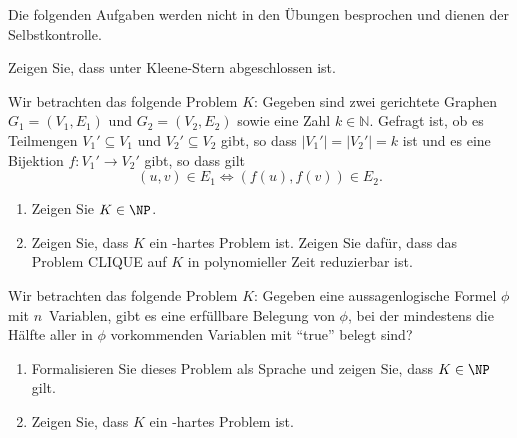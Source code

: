 \documentclass[german]{latteachCD}[2017/03/28]
\begin{document}
\maketitle

\begin{mdframed}
  Die folgenden Aufgaben werden nicht in den Übungen besprochen und dienen der
  Selbstkontrolle.

  \renewcommand{\theexercise}{\BoldGreek{exercise}}
  \setcounter{exercise}{1}

  \begin{exercise}
    Zeigen Sie, dass \NP{} unter Kleene-Stern abgeschlossen ist.
  \end{exercise}

  \begin{exercise}
    Wir betrachten das folgende Problem $K$: Gegeben sind zwei gerichtete
    Graphen $G_{1} = (V_{1}, E_{1})$ und $G_{2} = (V_{2}, E_{2})$ sowie eine
    Zahl $k \in \mathbb N$.  Gefragt ist, ob es Teilmengen $V_{1}' \subseteq
    V_{1}$ und $V_{2}' \subseteq V_{2}$ gibt, so dass $\lvert V_{1}'\rvert =
    \lvert V_{2}'\rvert = k$ ist und es eine Bijektion $f \colon V_{1}' \to
    V_{2}'$ gibt, so dass gilt
    \begin{equation*}
      (u,v) \in E_{1} \iff (f(u), f(v)) \in E_{2}.
    \end{equation*}
    \begin{enumerate}
    \item Zeigen Sie $K \in \NP$.
    \item Zeigen Sie, dass $K$ ein \NP-hartes Problem ist.  Zeigen Sie dafür,
      dass das Problem CLIQUE auf $K$ in polynomieller Zeit reduzierbar ist.
    \end{enumerate}
  \end{exercise}

\end{mdframed}

\vspace*{0.5\baselineskip}

\setcounter{exercise}{0}

\begin{exercise}
  Wir betrachten das folgende Problem $K$: Gegeben eine aussagenlogische
  Formel $\phi$ mit $n$~Variablen, gibt es eine erfüllbare Belegung von $\phi$,
  bei der mindestens die Hälfte aller in $\phi$ vorkommenden Variablen mit
  \enquote{true} belegt sind?
  \begin{enumerate}
  \item Formalisieren Sie dieses Problem als Sprache und zeigen Sie, dass $K \in
    \NP$ gilt.
  \item Zeigen Sie, dass $K$ ein \NP-hartes Problem ist.
  \end{enumerate}
\end{exercise}
\end{document}
